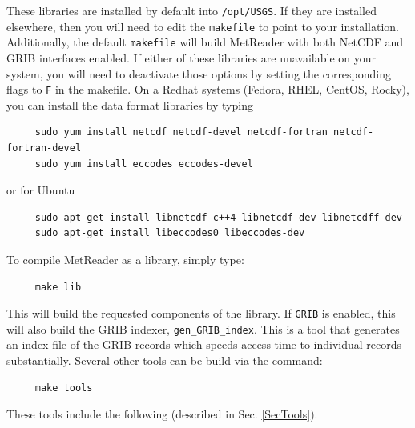 \documentclass[11pt]{article}   %
\begin{document}
These libraries are installed by default into \texttt{/opt/USGS}.  If they are
installed elsewhere, then you will need to edit the \texttt{makefile}
to point to your installation.
Additionally, the default \texttt{makefile} will build MetReader with both NetCDF and GRIB
interfaces enabled.  If either of these libraries are unavailable on your system, you will need to
deactivate those options by setting the corresponding flags to \texttt{F} in the makefile.
On a Redhat systems (Fedora, RHEL, CentOS, Rocky), you can install the data
format libraries by typing
\begin{verbatim}
     sudo yum install netcdf netcdf-devel netcdf-fortran netcdf-fortran-devel
     sudo yum install eccodes eccodes-devel
\end{verbatim}
or for Ubuntu
\begin{verbatim}
     sudo apt-get install libnetcdf-c++4 libnetcdf-dev libnetcdff-dev
     sudo apt-get install libeccodes0 libeccodes-dev
\end{verbatim}
To compile MetReader as a library, simply type:
\begin{verbatim}
     make lib
\end{verbatim}
This will build the requested components of the library.  If \texttt{GRIB} is enabled,
this will also build the GRIB indexer, \texttt{gen\_GRIB\_index}.
This is a tool that generates an index file of the GRIB records which speeds
access time to individual records substantially.
Several other tools can be build via the command:
\begin{verbatim}
     make tools
\end{verbatim}
These tools include the following (described in Sec. \ref{SecTools}).
\end{document}
